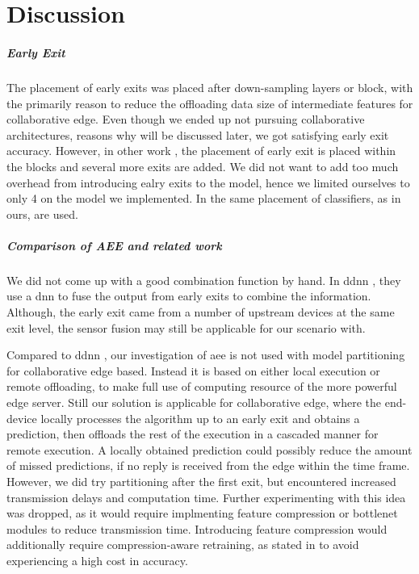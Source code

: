 \hypertarget{discussion}{%
\chapter{Discussion}\label{ch:discussion}}


\paragraph{Early Exit}
The placement of early exits was placed after down-sampling layers or block, with the primarily reason to reduce the offloading data size of intermediate features for collaborative edge. Even though we ended up not pursuing collaborative architectures, reasons why will be discussed later, we got satisfying early exit accuracy. However, in other work \cite{huang_multi-scale_2017}, the placement of early exit is placed within the blocks and several more exits are added. We did not want to add too much overhead from introducing ealry exits to the model, hence we limited ourselves to only 4 on the model we implemented. In \cite{berestizshevsky_sacrificing_2019} the same placement of classifiers, as in ours, are used.

\paragraph{Comparison of AEE and related work}

We did not come up with a good combination function by hand. In \gls{ddnn} \cite{teerapittayanon_distributed_2017}, they use a \gls{dnn} to fuse the output from  early exits to combine the information. Although, the early exit came from a number of upstream devices at the same exit level, the sensor fusion may still be applicable for our scenario with. 

Compared to \gls{ddnn} \cite{teerapittayanon_distributed_2017}, our investigation of \gls{aee} is not used with model partitioning for collaborative edge based. Instead it is based on either local execution or remote offloading, to make full use of computing resource of the more powerful edge server. Still our solution is applicable for collaborative edge, where the end-device locally processes the algorithm up to an early exit and obtains a prediction, then offloads the rest of the execution in a cascaded manner for remote execution. A locally obtained prediction could possibly reduce the amount of missed predictions, if no reply is received from the edge within the time frame. However, we did try partitioning after the first exit, but encountered increased transmission delays and computation time. Further experimenting with this idea was dropped, as it would require implmenting feature compression or \gls{bottlenet} modules to reduce transmission time. Introducing feature compression would additionally require compression-aware retraining, as stated in \cite{choi_near-lossless_2018,choi_near-lossless_2018,eshratifar_bottlenet:_2019}  to avoid experiencing a high cost in accuracy.

